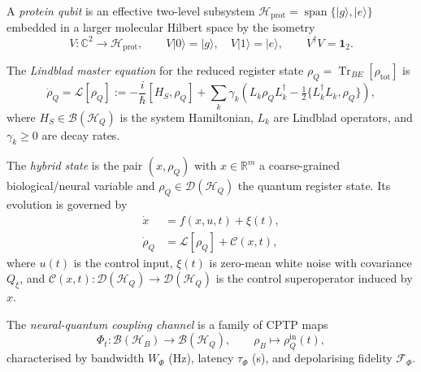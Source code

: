 \begin{definition}\label{def:protein-qubit}
A \emph{protein qubit} is an effective two-level subsystem
$\mathcal{H}_{\mathrm{prot}} = \operatorname{span}\{|g\rangle, |e\rangle\}$
embedded in a larger molecular Hilbert space by the isometry
\[
  V : \mathbb{C}^2 \to \mathcal{H}_{\mathrm{prot}},
  \qquad
  V|0\rangle = |g\rangle,\quad V|1\rangle = |e\rangle,
  \qquad V^\dagger V = \mathbf{1}_2.
\]
\end{definition}

\begin{definition}\label{def:lindblad}
The \emph{Lindblad master equation} for the reduced register state
$\rho_Q = \operatorname{Tr}_{BE}[\rho_{\mathrm{tot}}]$ is
\begin{equation}\label{eq:lindblad}
  \dot{\rho}_Q
  = \mathcal{L}[\rho_Q]
  := -\frac{i}{\hbar}[H_S, \rho_Q]
     + \sum_k \gamma_k \!\left(
         L_k \rho_Q L_k^\dagger
         - \tfrac{1}{2}\{L_k^\dagger L_k, \rho_Q\}
       \right),
\end{equation}
where $H_S \in \mathcal{B}(\mathcal{H}_Q)$ is the system Hamiltonian,
$L_k$ are Lindblad operators, and $\gamma_k \geq 0$ are decay rates.
\end{definition}

\begin{definition}\label{def:hybrid}
The \emph{hybrid state} is the pair $(x, \rho_Q)$ with
$x \in \mathbb{R}^m$ a coarse-grained biological/neural variable and
$\rho_Q \in \mathcal{D}(\mathcal{H}_Q)$ the quantum register state.
Its evolution is governed by
\begin{align}
  \dot{x} &= f(x, u, t) + \xi(t), \label{eq:classical-ode}\\
  \dot{\rho}_Q &= \mathcal{L}[\rho_Q] + \mathcal{C}(x, t), \label{eq:quantum-ode}
\end{align}
where $u(t)$ is the control input, $\xi(t)$ is zero-mean white noise
with covariance $Q_\xi$, and
$\mathcal{C}(x, t) : \mathcal{D}(\mathcal{H}_Q) \to \mathcal{D}(\mathcal{H}_Q)$
is the control superoperator induced by $x$.
\end{definition}

\begin{definition}\label{def:phi}
The \emph{neural-quantum coupling channel} is a family of CPTP maps
\[
  \Phi_t : \mathcal{B}(\mathcal{H}_B) \to \mathcal{B}(\mathcal{H}_Q),
  \qquad
  \rho_B \mapsto \rho_Q^{\mathrm{in}}(t),
\]
characterised by bandwidth $W_\Phi$ (Hz), latency $\tau_\Phi$ (s),
and depolarising fidelity $\mathcal{F}_\Phi$.
\end{definition}

